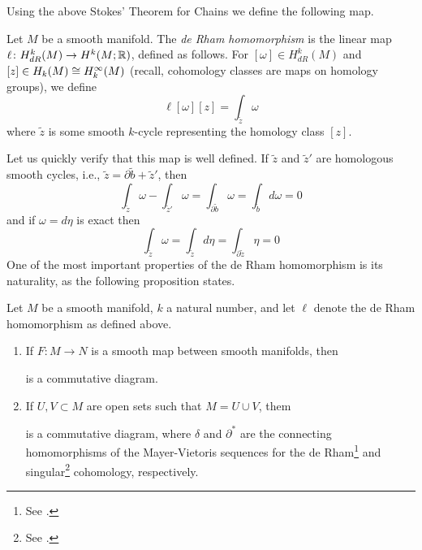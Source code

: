 \documentclass[a4paper, 12pt]{article}
\begin{document}
Using the above Stokes' Theorem for Chains we define the following map.
\begin{definition}
    Let $M$ be a smooth manifold.
    The \emph{de Rham homomorphism} is the linear map $\ell \colon H_{dR}^k(M) \to H^k(M; \mathbb{R})$,
    defined as follows. For $[\omega] \in H_{dR}^k(M)$ and $[z] \in H_k(M) \cong H_k^\infty(M)$ (recall, cohomology classes are maps on homology groups), we define
    \[
        \ell [\omega] [z] = \int_{\tilde{z}} \omega
    \]
    where $\tilde{z}$ is some smooth $k$-cycle representing the homology class $[z]$.
\end{definition}
Let us quickly verify that this map is well defined.
If $\tilde{z}$ and $\tilde{z}'$ are homologous smooth cycles, i.e., $\tilde{z} = \partial\tilde{b} + \tilde{z}'$,
then
\[
    \int_{\tilde{z}} \omega - \int_{\tilde{z}'} \omega
    = \int_{\partial\tilde{b}} \omega
    = \int_{\tilde{b}} d\omega
    = 0
\]
and if $\omega = d\eta$ is exact then
\[
    \int_{\tilde{z}} \omega
    = \int_{\tilde{z}} d\eta
    = \int_{\partial\tilde{z}} \eta
    = 0
\]
One of the most important properties of the de Rham homomorphism is its naturality, as the following proposition states.
\begin{proposition}
    Let $M$ be a smooth manifold, $k$ a natural number, and let $\ell$ denote the de Rham homomorphism as defined above.
    \begin{enumerate}[label=(\alph*)]
        \item If $F \colon M \to N$ is a smooth map between smooth manifolds, then

            
            is a commutative diagram.
        \item If $U, V \subset M$ are open sets such that $M = U \cup V$, them

            
            is a commutative diagram,
            where $\delta$ and $\partial^*$ are the connecting homomorphisms
            of the Mayer-Vietoris sequences for the de Rham\footnote{See \cite[Thm. 17.20]{Lee2012}.}
            and singular\footnote{See \cite[pp. 149, 203]{Hatcher2002}.} cohomology, respectively.
    \end{enumerate}
\end{proposition}
\end{document}
